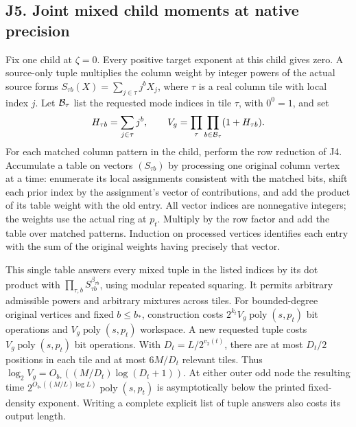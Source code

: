 \documentclass[11pt,a4paper]{article}
\begin{document}
\subsection{J5. Joint mixed child moments at native
precision}\label{v9-j5-joint-mixed-child-moments-at-native-precision}

Fix one child at \(\zeta=0\). Every positive target exponent at this
child gives zero. A source-only tuple multiplies the column weight by
integer powers of the actual source forms
\(S_{\tau b}(X)=\sum_{j\in\tau}j^b X_j\), where \(\tau\) is a real
column tile with local index \(j\). Let \({\cal B}_\tau\) list the
requested mode indices in tile \(\tau\), with \(0^0=1\), and set \[
 H_{\tau b}=\sum_{j\in\tau}j^b,\qquad
 V_g=\prod_\tau\prod_{b\in{\cal B}_\tau}(1+H_{\tau b}) .
\] For each matched column pattern in the child, perform the row
reduction of J4. Accumulate a table on vectors \((S_{\tau b})\) by
processing one original column vertex at a time: enumerate its local
assignments consistent with the matched bits, shift each prior index by
the assignment's vector of contributions, and add the product of its
table weight with the old entry. All vector indices are nonnegative
integers; the weights use the actual ring at \(p_t\). Multiply by the
row factor and add the table over matched patterns. Induction on
processed vertices identifies each entry with the sum of the original
weights having precisely that vector.

This single table answers every mixed tuple in the listed indices by its
dot product with \(\prod_{\tau,b}S_{\tau b}^{\beta_{\tau b}}\), using
modular repeated squaring. It permits arbitrary admissible powers and
arbitrary mixtures across tiles. For bounded-degree original vertices
and fixed \(b\le b_*\), construction costs
\(2^{k_t}V_g\operatorname{poly}(s,p_t)\) bit operations and
\(V_g\operatorname{poly}(s,p_t)\) workspace. A new requested tuple costs
\(V_g\operatorname{poly}(s,p_t)\) bit operations. With
\(D_t=L/2^{v_2(t)}\), there are at most \(D_t/2\) positions in each tile
and at most \(6M/D_t\) relevant tiles. Thus
\(\log_2 V_g=O_{b_*}((M/D_t)\log(D_t+1))\). At either outer odd node the
resulting time \(2^{O_{b_*}((M/L)\log L)}\operatorname{poly}(s,p_t)\) is
asymptotically below the printed fixed-density exponent. Writing a
complete explicit list of tuple answers also costs its output length.
\end{document}

